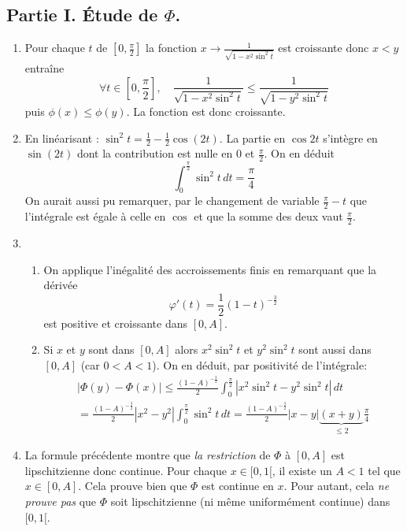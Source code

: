 \subsection*{Partie I. \'Etude de $\Phi$.}
\begin{enumerate}
\item  Pour chaque $t$ de $\left[ 0,\frac{\pi }{2}\right] $ la fonction $x\rightarrow \frac{1}{\sqrt{1-x^{2}\sin ^{2}t}}$ est croissante donc $x<y$
entra\^{i}ne
\begin{displaymath}
\forall t\in \left[ 0,\frac{\pi }{2}\right] ,\quad \frac{1}{\sqrt{1-x^{2}\sin ^{2}t}}\leq \frac{1}{\sqrt{1-y^{2}\sin ^{2}t}}  
\end{displaymath}
puis $\phi (x)\leq \phi (y)$. La fonction est donc croissante.

  \item En linéarisant : $\sin^2 t = \frac{1}{2} - \frac{1}{2}\cos(2t)$. La partie en $\cos 2t$ s'intègre en $\sin(2t)$ dont la contribution est nulle en $0$ et $\frac{\pi}{2}$. On en déduit
\begin{displaymath}
  \int_0^{\frac{\pi}{2}}\sin^2 t\,dt = \frac{\pi}{4}
\end{displaymath}
On aurait aussi pu remarquer, par le changement de variable $\frac{\pi}{2}-t$ que l'intégrale est égale à celle en $\cos$ et que la somme des deux vaut $\frac{\pi}{2}$.
  \item
\begin{enumerate}
  \item On applique l'inégalité des accroissements finis en remarquant que la dérivée 
\begin{displaymath}
  \varphi'(t) = \frac{1}{2}(1-t)^{-\frac{3}{2}}
\end{displaymath}
est positive et croissante dans $[0,A]$.
  \item Si $x$ et $y$ sont dans $[0,A]$ alors $x^2\sin^2 t$ et $y^2\sin^2 t$ sont aussi dans $[0,A]$ (car $0 <A<1$). On en déduit, par positivité de l'intégrale:
\begin{multline*}
  \left|\Phi(y) - \Phi(x)\right| \leq
\frac{(1-A)^{-\frac{3}{2}}}{2}\int_{0}^{\frac{\pi}{2}}\left| x^2\sin^2 t - y^2 \sin^2 t\right|\, dt \\
= \frac{(1-A)^{-\frac{3}{2}}}{2}|x^2-y^2|\int_{0}^{\frac{\pi}{2}}\sin^2t \,dt 
= \frac{(1-A)^{-\frac{3}{2}}}{2}|x-y|\underset{\leq 2}{\underbrace{(x+y)}}\frac{\pi}{4}
\end{multline*}
\end{enumerate}

  \item La formule précédente montre que \emph{la restriction} de $\Phi$ à $[0,A]$ est lipschitzienne donc continue. Pour chaque $x\in [0,1[$, il existe un $A<1$ tel que $x\in [0,A]$. Cela prouve bien que $\Phi$ est continue en $x$. Pour autant, cela \emph{ne prouve pas} que $\Phi$ soit lipschitzienne (ni même uniformément continue) dans $[0,1[$.
\end{enumerate}


